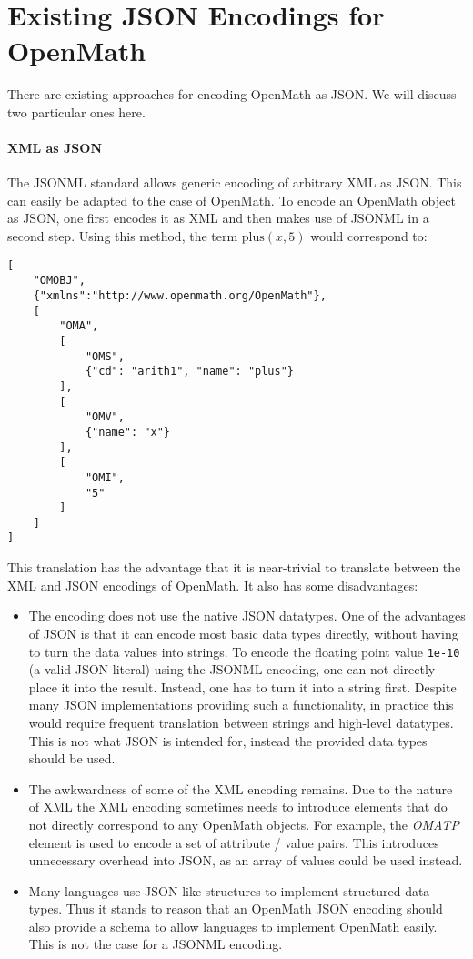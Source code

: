 \section{Existing JSON Encodings for OpenMath}\label{sec:ex}

There are existing approaches for encoding OpenMath as JSON.  We will discuss two
particular ones here.

\paragraph{XML as JSON}
The JSONML standard \cite{jsonml:webpage} allows generic encoding of arbitrary XML as
JSON.  This can easily be adapted to the case of OpenMath.  To encode an OpenMath object
as JSON, one first encodes it as XML and then makes use of JSONML in a second step.  Using
this method, the term $\mathrm{plus}(x, 5)$ would correspond to:
\begin{lstlisting}
[
    "OMOBJ",
    {"xmlns":"http://www.openmath.org/OpenMath"},
    [
        "OMA",
        [
            "OMS", 
            {"cd": "arith1", "name": "plus"}
        ],
        [
            "OMV", 
            {"name": "x"}
        ],
        [
            "OMI", 
            "5"
        ]
    ]
]
\end{lstlisting}

This translation has the advantage that it is near-trivial to translate between the XML and JSON encodings of OpenMath. 
It also has some disadvantages: 

\begin{itemize}
    \item The encoding does not use the native JSON datatypes. 
    One of the advantages of JSON is that it can encode most basic data types directly, without having to turn the data values into strings. 
    To encode the floating point value \lstinline{1e-10} (a valid JSON literal) using the JSONML encoding, one can not directly place it into the result. 
    Instead, one has to turn it into a string first.   
    Despite many JSON implementations providing such a functionality, in practice this would require frequent translation between strings and high-level datatypes.  
    This is not what JSON is intended for, instead the provided data types should be used. 

    \item The awkwardness of some of the XML encoding remains. 
    Due to the nature of XML the XML encoding sometimes needs to introduce elements that do not directly correspond to any OpenMath objects. 
    For example, the \textit{OMATP} element is used to encode a set of attribute / value pairs. 
    This introduces unnecessary overhead into JSON, as an array of values could be used instead. 

    \item Many languages use JSON-like structures to implement structured data types. 
    Thus it stands to reason that an OpenMath JSON encoding should also provide a schema to allow languages to implement OpenMath easily. This is not the case for a JSONML encoding. 
\end{itemize}

